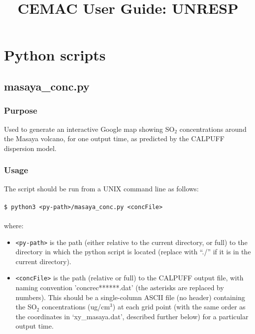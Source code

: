 \documentclass[10pt,a4paper]{article}
\title{CEMAC User Guide: UNRESP}
\newcommand\tab[1][0.5cm]{\hspace*{#1}}
\begin{document}
\maketitle
\tableofcontents

\section{Python scripts}

\subsection{masaya\_conc.py}

\subsubsection{Purpose}

Used to generate an interactive Google map showing SO$_2$ concentrations around the Masaya volcano, for one output time, as predicted by the CALPUFF dispersion model.

\subsubsection{Usage}
The script should be run from a UNIX command line as follows:\\\\
\tab \texttt{\$ python3 <py-path>/masaya\_conc.py <concFile>}\\\\
where:
\begin{itemize}
\item \texttt{<py-path>} is the path (either relative to the current directory, or full) to the directory in which the python script is located (replace with “./” if it is in the current directory).
\item \texttt{<concFile>} is the path (relative or full) to the CALPUFF output file, with naming convention 'concrec******.dat' (the asterisks are replaced by numbers). This should be a single-column ASCII file (no header) containing the SO$_2$ concentrations (ug/cm$^3$) at each grid point (with the same order as the coordinates in `xy\_masaya.dat', described further below) for a particular output time.
\end{itemize}
\end{document}
